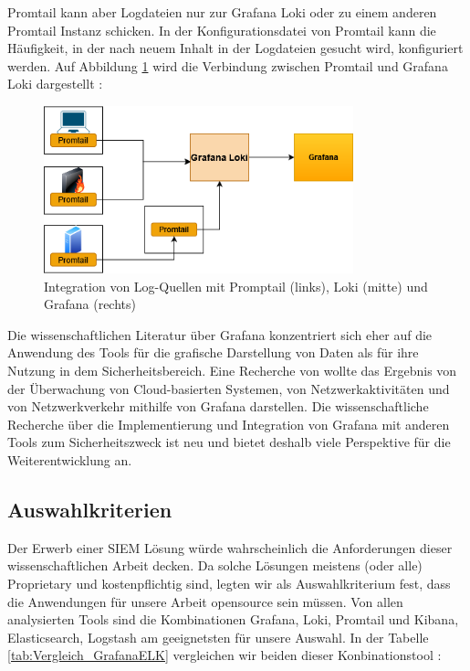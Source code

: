 Promtail kann aber Logdateien nur zur Grafana Loki oder zu einem anderen Promtail Instanz schicken. In der Konfigurationsdatei von Promtail kann die Häufigkeit, in der nach neuem Inhalt in der Logdateien gesucht wird, konfiguriert werden. Auf Abbildung \ref{fig:Integration_Loki_Promtail_Grafana} wird die Verbindung zwischen Promtail und Grafana Loki dargestellt \citep{Grafana_Logs}:


\begin{figure}[H]
   \centering
   \includegraphics[width=0.8\textwidth]{assets/Promtail.png}
   \caption[Integration von Log-Quellen mit Promptail, Loki und Grafana]
   {Integration von Log-Quellen mit Promptail (links), Loki (mitte) und Grafana (rechts)}
   \label{fig:Integration_Loki_Promtail_Grafana}
   \centering
\end{figure}

Die wissenschaftlichen Literatur über Grafana konzentriert sich eher auf die Anwendung des Tools für die grafische Darstellung von Daten als für ihre Nutzung in dem Sicherheitsbereich. Eine Recherche von \cite{Manases_grafananetwork} wollte das Ergebnis von der Überwachung von Cloud-basierten Systemen, von Netzwerkaktivitäten und von Netzwerkverkehr mithilfe von Grafana darstellen.
Die wissenschaftliche Recherche über die Implementierung und Integration von Grafana mit anderen Tools zum Sicherheitszweck ist neu und bietet deshalb viele  Perspektive für die Weiterentwicklung an.

\subsection{Auswahlkriterien}
Der Erwerb einer \gls{SIEM} Lösung würde wahrscheinlich die Anforderungen dieser wissenschaftlichen Arbeit decken. Da solche Lösungen meistens (oder alle) \gls{Proprietary} und kostenpflichtig sind, legten wir als Auswahlkriterium fest, dass die Anwendungen für unsere Arbeit \gls{opensource} sein müssen. Von allen analysierten Tools sind die Kombinationen Grafana, Loki, Promtail und Kibana, Elasticsearch, Logstash  am geeignetsten für unsere Auswahl. In der Tabelle \ref{tab:Vergleich_GrafanaELK} vergleichen wir beiden dieser Konbinationstool \citep{Anand_LokixELK}:

